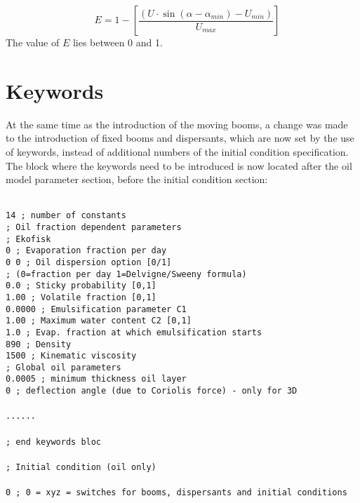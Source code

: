 \documentclass[english]{deltares_manual}
\newcommand\tab[1][1cm]{\hspace*{#1}}
\begin{document}
\begin{equation}\label{eq:boomeff}
\quad
	E = 1-\left[\frac{(U \cdot \sin(\alpha-\alpha_{min}) - U_{min})}{U_{max}} \right]
\end{equation}
The value of $E$ lies between 0 and 1.


\section{Keywords}
At the same time as the introduction of the moving booms, a change was made to the introduction of fixed booms and dispersants, which are now set by the use of keywords, instead of additional numbers of the initial condition specification. The block where the keywords need to be introduced is now located after the oil model parameter section, before the initial condition section:
\begin{tcolorbox}
	\footnotesize
	\texttt{\\
14 ; number of constants \\
 ; Oil fraction dependent parameters \\
; Ekofisk \\
0    \tab           ; Evaporation fraction per day \\
0   0 \tab          ; Oil dispersion option [0/1] \\
\tab; (0=fraction per day 1=Delvigne/Sweeny formula) \\
0.0 \tab              ; Sticky probability [0,1] \\
1.00 \tab              ; Volatile fraction [0,1] \\
0.0000  \tab             ; Emulsification parameter C1 \\
1.00       \tab       ; Maximum water content C2  [0,1] \\
1.0        \tab      ; Evap. fraction at which emulsification starts \\
890          \tab     ; Density \\
1500         \tab      ; Kinematic viscosity \\
\tab ; Global oil parameters \\
0.0005        \tab       ; minimum thickness oil layer \\
0          \tab     ; deflection angle (due to Coriolis force) - only for 3D \\
\\
...... \\
\\
; end keywords bloc \\
\\
\tab ;                            Initial condition (oil only) \\
\\
0	\tab ; 0 = xyz = switches for booms, dispersants and initial conditions 
}
\end{tcolorbox}
\end{document}
